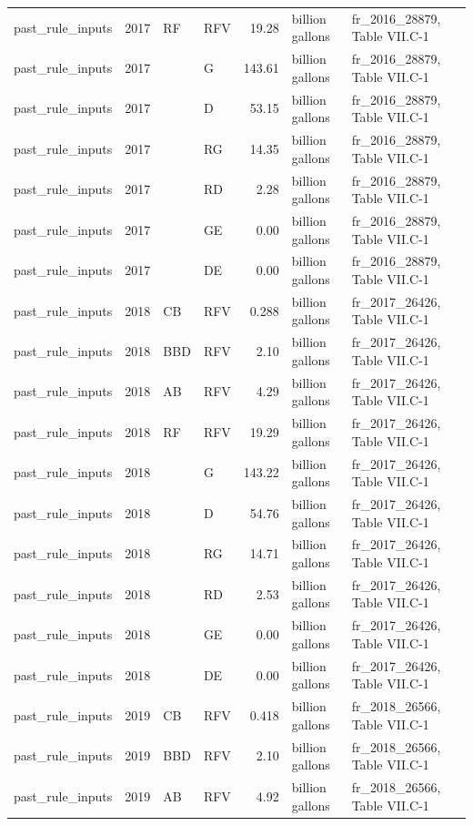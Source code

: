 \begin{longtable}{p{2.3cm}p{0.7cm}p{1.0cm}p{2.6cm}rp{1.7cm}p{4.6cm}}
past\_rule\_inputs & 2017 & RF & RFV & 19.28 & billion gallons & fr\_2016\_28879, Table VII.C-1 \\
past\_rule\_inputs & 2017 &  & G & 143.61 & billion gallons & fr\_2016\_28879, Table VII.C-1 \\
past\_rule\_inputs & 2017 &  & D & 53.15 & billion gallons & fr\_2016\_28879, Table VII.C-1 \\
past\_rule\_inputs & 2017 &  & RG & 14.35 & billion gallons & fr\_2016\_28879, Table VII.C-1 \\
past\_rule\_inputs & 2017 &  & RD & 2.28 & billion gallons & fr\_2016\_28879, Table VII.C-1 \\
past\_rule\_inputs & 2017 &  & GE & 0.00 & billion gallons & fr\_2016\_28879, Table VII.C-1 \\
past\_rule\_inputs & 2017 &  & DE & 0.00 & billion gallons & fr\_2016\_28879, Table VII.C-1 \\
past\_rule\_inputs & 2018 & CB & RFV & 0.288 & billion gallons & fr\_2017\_26426, Table VII.C-1 \\
past\_rule\_inputs & 2018 & BBD & RFV & 2.10 & billion gallons & fr\_2017\_26426, Table VII.C-1 \\
past\_rule\_inputs & 2018 & AB & RFV & 4.29 & billion gallons & fr\_2017\_26426, Table VII.C-1 \\
past\_rule\_inputs & 2018 & RF & RFV & 19.29 & billion gallons & fr\_2017\_26426, Table VII.C-1 \\
past\_rule\_inputs & 2018 &  & G & 143.22 & billion gallons & fr\_2017\_26426, Table VII.C-1 \\
past\_rule\_inputs & 2018 &  & D & 54.76 & billion gallons & fr\_2017\_26426, Table VII.C-1 \\
past\_rule\_inputs & 2018 &  & RG & 14.71 & billion gallons & fr\_2017\_26426, Table VII.C-1 \\
past\_rule\_inputs & 2018 &  & RD & 2.53 & billion gallons & fr\_2017\_26426, Table VII.C-1 \\
past\_rule\_inputs & 2018 &  & GE & 0.00 & billion gallons & fr\_2017\_26426, Table VII.C-1 \\
past\_rule\_inputs & 2018 &  & DE & 0.00 & billion gallons & fr\_2017\_26426, Table VII.C-1 \\
past\_rule\_inputs & 2019 & CB & RFV & 0.418 & billion gallons & fr\_2018\_26566, Table VII.C-1 \\
past\_rule\_inputs & 2019 & BBD & RFV & 2.10 & billion gallons & fr\_2018\_26566, Table VII.C-1 \\
past\_rule\_inputs & 2019 & AB & RFV & 4.92 & billion gallons & fr\_2018\_26566, Table VII.C-1 \\

\end{longtable}
